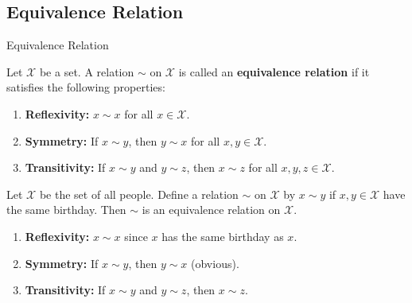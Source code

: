 \documentclass{zkdl-presentation-template}
\begin{document}
    \subsection{Equivalence Relation}
    \begin{frame}{Equivalence Relation}
        \begin{definition}
            Let $\mathcal{X}$ be a set. A relation $\sim$ on $\mathcal{X}$ is called an \textbf{equivalence relation} if it satisfies the following properties:
            \begin{enumerate}
                \item \textbf{Reflexivity:} $x \sim x$ for all $x \in \mathcal{X}$.
                \item \textbf{Symmetry:} If $x \sim y$, then $y \sim x$ for all $x,y \in \mathcal{X}$.
                \item \textbf{Transitivity:} If $x \sim y$ and $y \sim z$, then $x \sim z$ for all $x,y,z \in \mathcal{X}$.
            \end{enumerate}
        \end{definition}
        
        \begin{example}
            Let $\mathcal{X}$ be the set of all people. Define a relation $\sim$ on $\mathcal{X}$ by $x \sim y$ if $x,y \in \mathcal{X}$ have the same birthday. 
            Then $\sim$ is an equivalence relation on $\mathcal{X}$.
            \begin{enumerate}
                \item \textbf{Reflexivity:} $x \sim x$ since $x$ has the same birthday as $x$.
                \item \textbf{Symmetry:} If $x \sim y$, then $y \sim x$ (obvious).
                \item \textbf{Transitivity:} If $x \sim y$ and $y \sim z$, then $x \sim z$.
            \end{enumerate}
        \end{example}
    \end{frame}
\end{document}
